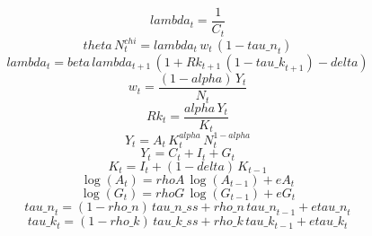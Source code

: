 \begin{dmath}
{lambda}_{t}=\frac{1}{{C}_{t}}
\end{dmath}
\begin{dmath}
{theta}\, {N}_{t}^{{chi}}={lambda}_{t}\, {w}_{t}\, \left(1-{tau\_n}_{t}\right)
\end{dmath}
\begin{dmath}
{lambda}_{t}={beta}\, {lambda}_{t+1}\, \left(1+{Rk}_{t+1}\, \left(1-{tau\_k}_{t+1}\right)-{delta}\right)
\end{dmath}
\begin{dmath}
{w}_{t}=\frac{\left(1-{alpha}\right)\, {Y}_{t}}{{N}_{t}}
\end{dmath}
\begin{dmath}
{Rk}_{t}=\frac{{alpha}\, {Y}_{t}}{{K}_{t}}
\end{dmath}
\begin{dmath}
{Y}_{t}={A}_{t}\, {K}_{t}^{{alpha}}\, {N}_{t}^{1-{alpha}}
\end{dmath}
\begin{dmath}
{Y}_{t}={C}_{t}+{I}_{t}+{G}_{t}
\end{dmath}
\begin{dmath}
{K}_{t}={I}_{t}+\left(1-{delta}\right)\, {K}_{t-1}
\end{dmath}
\begin{dmath}
\log\left({A}_{t}\right)={rhoA}\, \log\left({A}_{t-1}\right)+{eA}_{t}
\end{dmath}
\begin{dmath}
\log\left({G}_{t}\right)={rhoG}\, \log\left({G}_{t-1}\right)+{eG}_{t}
\end{dmath}
\begin{dmath}
{tau\_n}_{t}=\left(1-{rho\_n}\right)\, {tau\_n\_ss}+{rho\_n}\, {tau\_n}_{t-1}+{etau\_n}_{t}
\end{dmath}
\begin{dmath}
{tau\_k}_{t}=\left(1-{rho\_k}\right)\, {tau\_k\_ss}+{rho\_k}\, {tau\_k}_{t-1}+{etau\_k}_{t}
\end{dmath}
